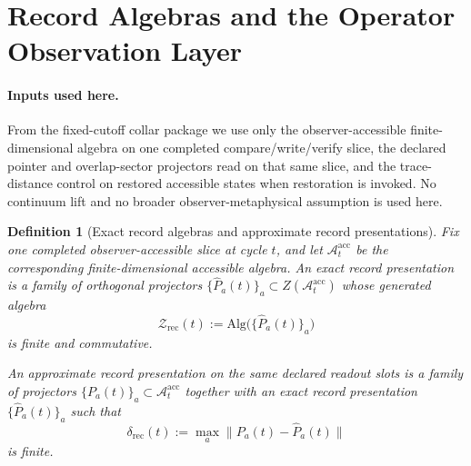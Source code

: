 \documentclass[11pt]{article}
\newtheorem{definition}[theorem]{Definition}
\theoremstyle{remark}
\theoremstyle{plain}
\begin{document}
\section{Record Algebras and the Operator Observation Layer}

\paragraph{Inputs used here.}
From the fixed-cutoff collar package we use only the observer-accessible finite-dimensional algebra
on one completed compare/write/verify slice, the declared pointer and overlap-sector projectors
read on that same slice, and the trace-distance control on restored accessible states when
restoration is invoked. No continuum lift and no broader observer-metaphysical assumption is used
here.

\begin{definition}[Exact record algebras and approximate record presentations]\label{def:lattice}
Fix one completed observer-accessible slice at cycle \(t\), and let
\(\mathcal A_t^{\mathrm{acc}}\) be the corresponding finite-dimensional accessible algebra. An
\emph{exact record presentation} is a family of orthogonal projectors
\(\{\widehat P_a(t)\}_a\subset Z(\mathcal A_t^{\mathrm{acc}})\) whose generated algebra
\[
\mathcal Z_{\mathrm{rec}}(t)
:=
\mathrm{Alg}\bigl(\{\widehat P_a(t)\}_a\bigr)
\]
is finite and commutative.

An \emph{approximate record presentation} on the same declared readout slots is a family of
projectors \(\{P_a(t)\}_a\subset \mathcal A_t^{\mathrm{acc}}\) together with an exact record
presentation \(\{\widehat P_a(t)\}_a\) such that
\[
\delta_{\mathrm{rec}}(t)
:=
\max_a \|P_a(t)-\widehat P_a(t)\|
\]
is finite.
\end{definition}
\end{document}
